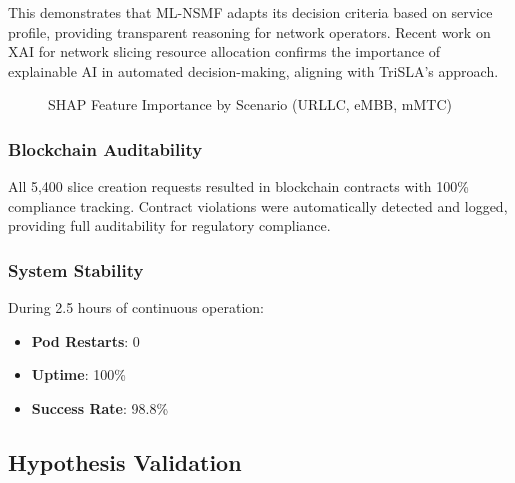 \documentclass[review]{elsarticle}
\begin{document}
This demonstrates that ML-NSMF adapts its decision criteria based on service profile, providing transparent reasoning for network operators. Recent work on XAI for network slicing resource allocation \cite{xai-networks-2024} confirms the importance of explainable AI in automated decision-making, aligning with TriSLA's approach.

\begin{figure}[h]
\centering
{}
\caption{SHAP Feature Importance by Scenario (URLLC, eMBB, mMTC)}
\label{fig:shap}
\end{figure}

\subsubsection{Blockchain Auditability}

All 5,400 slice creation requests resulted in blockchain contracts with 100\% compliance tracking. Contract violations were automatically detected and logged, providing full auditability for regulatory compliance.

\subsubsection{System Stability}

During 2.5 hours of continuous operation:
\begin{itemize}
    \item \textbf{Pod Restarts}: 0
    \item \textbf{Uptime}: 100\%
    \item \textbf{Success Rate}: 98.8\%
\end{itemize}

\subsection{Hypothesis Validation}
\end{document}
